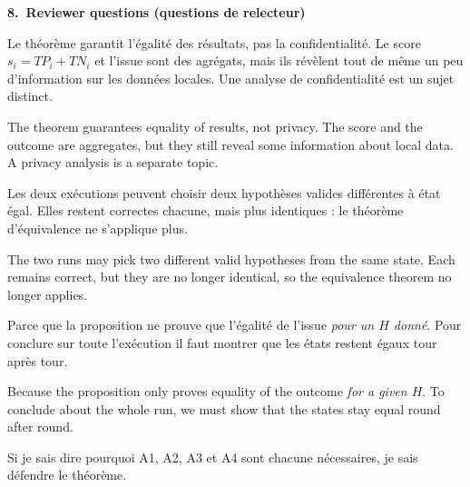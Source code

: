 \documentclass[10pt]{article}
\newcommand{\titrebox}[2]{\needspace{10\baselineskip}\vspace{8pt}
  \begin{tcolorbox}[colback=marine, colframe=marine, arc=0pt, boxrule=0pt,
    top=4pt, bottom=4pt, left=8pt]
  \color{white}\Large\bfseries #1.~#2
  \end{tcolorbox}\vspace{2pt}}
\newcommand{\st}[1]{\par\needspace{7\baselineskip}\vspace{5pt}{\normalsize\bfseries\textcolor{marine}{#1}}\par\vspace{2pt}}
\begin{document}
\titrebox{8}{Reviewer questions (questions de relecteur)}

\st{``Pourquoi les comptes ne suffisent-ils pas à mesurer la fuite d'information ?''}
\begin{dire}
Le théorème garantit l'égalité des résultats, pas la confidentialité. Le score $s_i=TP_i+TN_i$ et l'issue sont des agrégats, mais ils révèlent tout de même
un peu d'information sur les données locales. Une analyse de confidentialité est un sujet distinct.
\end{dire}
\begin{direEN}
The theorem guarantees equality of results, not privacy. The score and the outcome are aggregates, but they still reveal some information about local data.
A privacy analysis is a separate topic.
\end{direEN}

\st{``Que se passe-t-il si le générateur n'est pas déterministe ?''}
\begin{dire}
Les deux exécutions peuvent choisir deux hypothèses valides différentes à état égal. Elles restent correctes chacune, mais plus identiques : le théorème d'équivalence ne s'applique plus.
\end{dire}
\begin{direEN}
The two runs may pick two different valid hypotheses from the same state. Each remains correct, but they are no longer identical, so the equivalence theorem no longer applies.
\end{direEN}

\st{``Pourquoi la récurrence ?''}
\begin{dire}
Parce que la proposition ne prouve que l'égalité de l'issue \emph{pour un $H$ donné}. Pour conclure sur toute l'exécution il faut montrer que les états restent égaux tour après tour.
\end{dire}
\begin{direEN}
Because the proposition only proves equality of the outcome \emph{for a given $H$}. To conclude about the whole run, we must show that the states stay equal round after round.
\end{direEN}

\vspace{8pt}
\begin{tcolorbox}[colback=marine, colframe=marine, arc=0pt, boxrule=0pt,
  halign=center, top=4pt, bottom=4pt]
\color{white}\small Si je sais dire pourquoi A1, A2, A3 et A4 sont chacune nécessaires, je sais défendre le théorème.
\end{tcolorbox}
\end{document}

